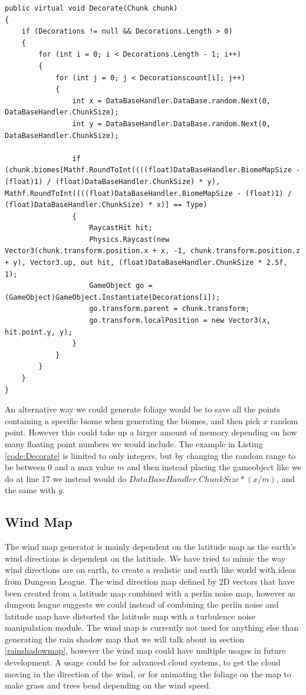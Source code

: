 \begin{lstlisting}[caption = The decorate function in the Biome class., label=code:Decorate, language=Csharp]
public virtual void Decorate(Chunk chunk)
{
	if (Decorations != null && Decorations.Length > 0)
	{
		for (int i = 0; i < Decorations.Length - 1; i++)
		{
			for (int j = 0; j < Decorationscount[i]; j++)
			{
				int x = DataBaseHandler.DataBase.random.Next(0, DataBaseHandler.ChunkSize);
				int y = DataBaseHandler.DataBase.random.Next(0, DataBaseHandler.ChunkSize);
				
				if (chunk.biomes[Mathf.RoundToInt((((float)DataBaseHandler.BiomeMapSize - (float)1) / (float)DataBaseHandler.ChunkSize) * y), 	Mathf.RoundToInt((((float)DataBaseHandler.BiomeMapSize - (float)1) / (float)DataBaseHandler.ChunkSize) * x)] == Type)
				{
					RaycastHit hit;
					Physics.Raycast(new Vector3(chunk.transform.position.x + x, -1, chunk.transform.position.z + y), Vector3.up, out hit, (float)DataBaseHandler.ChunkSize * 2.5f, 1);
					GameObject go = (GameObject)GameObject.Instantiate(Decorations[i]);
					go.transform.parent = chunk.transform;
					go.transform.localPosition = new Vector3(x, hit.point.y, y);
				}
			}
		}
	}
}
\end{lstlisting}

An alternative way we could generate foliage would be to save all the points containing a specific biome when generating the biomes, and then pick $x$ random point. However this could take up a larger amount of memory depending on how many floating point numbers we would include. The example in Listing \ref{code:Decorate} is limited to only integers, but by changing the random range to be between 0 and a max value $m$ and then instead placing the gameobject like we do at line 17 we instead would do $DataBaseHandler.ChunkSize * (x / m)$, and the same with $y$.


\subsection{Wind Map}
\label{windmap}

The wind map generator is mainly dependent on the latitude map as the earth's wind directions is dependent on the latitude. We have tried to mimic the way wind directions are on earth, to create a realistic and earth like world with ideas from Dungeon League\cite{WindMap}. The wind direction map defined by 2D vectors that have been created from a latitude map combined with a perlin noise map, however as dungeon league suggests we could instead of combining the perlin noise and latitude map have distorted the latitude map with a turbulence noise manipulation module. The wind map is currently not used for anything else than generating the rain shadow map that we will talk about in section \ref{rainshadowmap}, however the wind map could have multiple usages in future development. A usage could be for advanced cloud systems, to get the cloud moving in the direction of the wind, or for animating the foliage on the map to make grass and trees bend depending on the wind speed.


